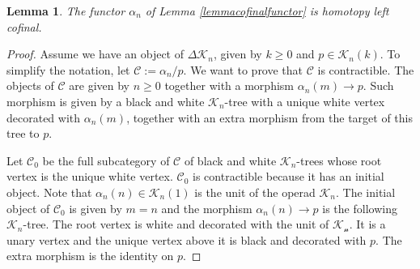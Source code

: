 \documentclass[]{amsart}
\newtheorem{lemma}[theorem]{Lemma}
\theoremstyle{definition}
\begin{document}
\begin{lemma}
	The functor $\alpha_n$ of Lemma \ref{lemmacofinalfunctor} is homotopy left cofinal.
\end{lemma}

\begin{proof}
	Assume we have an object of $\Delta\mathcal{K}_n$, given by $k \geq 0$ and $p \in \mathcal{K}_n(k)$. To simplify the notation, let $\mathcal{C} := \alpha_n / p$. We want to prove that $\mathcal{C}$ is contractible. The objects of $\mathcal{C}$ are given by $n \geq 0$ together with a morphism $\alpha_n(m) \to p$. Such morphism is given by a black and white $\mathcal{K}_n$-tree with a unique white vertex decorated with $\alpha_n(m)$, together with an extra morphism from the target of this tree to $p$.
	
	Let $\mathcal{C}_0$ be the full subcategory of $\mathcal{C}$ of black and white $\mathcal{K}_n$-trees whose root vertex is the unique white vertex. $\mathcal{C}_0$ is contractible because it has an initial object. Note that $\alpha_n(n) \in \mathcal{K}_n(1)$ is the unit of the operad $\mathcal{K}_n$. The initial object of $\mathcal{C}_0$ is given by $m=n$ and the morphism $\alpha_n(n) \to p$ is the following $\mathcal{K}_n$-tree. The root vertex is white and decorated with the unit of $\mathcal{K_n}$. It is a unary vertex and the unique vertex above it is black and decorated with $p$. The extra morphism is the identity on $p$.
	

\end{proof}
\end{document}
